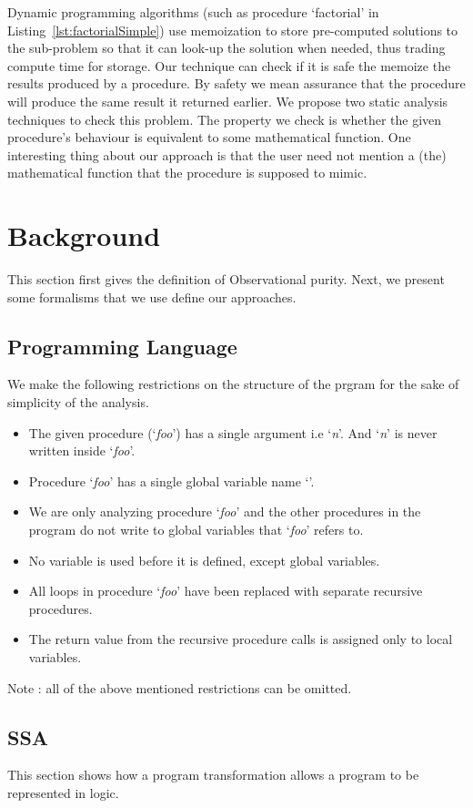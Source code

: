\documentclass{llncs}
\newcommand{\foo}{\textit{foo}}
\newcommand{\n}{\textit{n}}
\newcommand{\g}{\mathit{g}}
\begin{document}
Dynamic programming algorithms (such as procedure `factorial' in
Listing~\ref{lst:factorialSimple}) use memoization to store
pre-computed solutions to the sub-problem so that it can look-up the
solution when needed, thus trading compute time for storage. Our
technique can check if it is safe the memoize the results produced by
a procedure. By safety we mean assurance that the procedure will
produce the same result it returned earlier. We propose two static
analysis techniques to check this problem. The property we check is
whether the given procedure's behaviour is equivalent to some
mathematical function.  One interesting thing about our approach is
that the user need not mention a (the) mathematical function that the
procedure is supposed to mimic.


\section{Background} \label{sec:background}
This section first gives the definition of Observational purity. Next,
we present some formalisms that we use define our approaches.

\subsection{Programming Language}
We make the following restrictions on the structure of the prgram for
the sake of simplicity of the analysis.

\begin{itemize}
\item The given procedure (`\foo') has a single argument i.e `\n'. And
  `\n' is never written inside `\foo'.
\item Procedure `\foo' has a single global variable name `\g'.
\item We are only analyzing procedure `\foo' and the other procedures
  in the program do not write to global variables that `\foo' refers
  to.
\item No variable is used before it is defined, except global
  variables.
\item All loops in procedure `\foo' have been replaced with separate
  recursive procedures.
\item The return value from the recursive procedure calls is assigned
  only to local variables.
\end{itemize}

Note : all of the above mentioned restrictions can be omitted.
\subsection{SSA}
This section shows how a program transformation allows a program to be
represented in logic.
\end{document}
